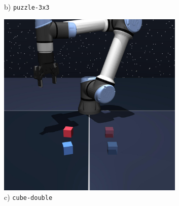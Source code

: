 \begin{figure}[t]
\begin{minipage}{0.24\textwidth}
\begin{subfigure}{\textwidth}
            \caption{\footnotesize b) \texttt{puzzle-3x3}}
            \label{fig:puzzle-viz}
        \end{subfigure}
    \end{minipage}\hfill
    \begin{minipage}{0.24\textwidth}
        \begin{subfigure}{\textwidth}
            \centering
            \includegraphics[width=0.98\textwidth]{figures/renders/cube-double-play-singletask-task2-v0.jpeg}
            \caption{\footnotesize c) \texttt{cube-double}}
            \label{fig:cube-double-viz}
        \end{subfigure}
    \end{minipage}\hfill
    \begin{minipage}{0.24\textwidth}
        \begin{subfigure}{\textwidth}
            \centering

\end{subfigure}
\end{minipage}
\end{figure}
